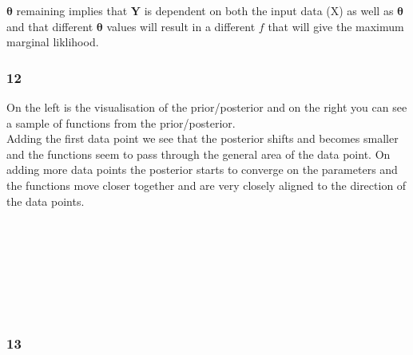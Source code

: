 \documentclass[11pt]{article}
\begin{document}
\(\boldsymbol{\theta}\) remaining implies that \(\boldsymbol{Y}\) is
dependent on both the input data (X) as well as \(\boldsymbol{\theta}\)
and that different \(\boldsymbol{\theta}\) values will result in a
different \(f\) that will give the maximum marginal liklihood.

    \subsubsection*{12}\label{section}

On the left is the visualisation of the prior/posterior and on the right
you can see a sample of functions from the prior/posterior.\\
Adding the first data point we see that the posterior shifts and becomes
smaller and the functions seem to pass through the general area of the
data point. On adding more data points the posterior starts to converge
on the parameters and the functions move closer together and are very
closely aligned to the direction of the data points.
    \begin{center}
    \end{center}
    { \hspace*{\fill} \\}

    \begin{center}
    \end{center}
    { \hspace*{\fill} \\}

    \begin{center}
    \end{center}
    { \hspace*{\fill} \\}

    \begin{center}
    \end{center}
    { \hspace*{\fill} \\}

    \subsubsection*{13}\label{section}
\end{document}
